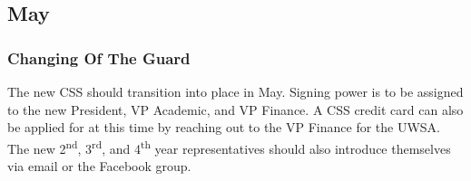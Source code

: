 \documentclass[12pt]{article}
\begin{document}
\subsection{May}

\subsubsection{Changing Of The Guard}
The new CSS should transition into place in May.  Signing power is to be assigned
to the new President, VP Academic, and VP Finance.  A CSS credit card can also
be applied for at this time by reaching out to the VP Finance for the UWSA. The new
2\textsuperscript{nd}, 3\textsuperscript{rd}, and 4\textsuperscript{th} year representatives
should also introduce themselves via email or the Facebook group.
\end{document}
